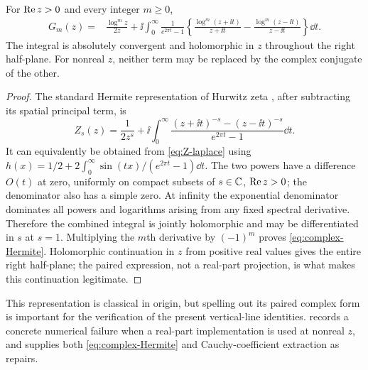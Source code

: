 \begin{proposition}\label{thm:complex-Hermite}
For $\operatorname{Re} z>0$ and every integer $m\ge0$,
\begin{align}
 G_m(z)={}&\frac{\log^m z}{2z}
  +\ii\int_0^\infty\frac1{e^{2\pi t}-1}
       \left\{\frac{\log^m(z+\ii t)}{z+\ii t}
                  -\frac{\log^m(z-\ii t)}{z-\ii t}\right\}\dd t.
                     \label{eq:complex-Hermite}
\end{align}
The integral is absolutely convergent and holomorphic in $z$ throughout
the right half-plane. For nonreal $z$, neither term may be replaced by
the complex conjugate of the other.
\end{proposition}
\begin{proof}
The standard Hermite representation of Hurwitz zeta
\cite{dlmf-zeta}, after subtracting its spatial principal term, is
\[
 Z_s(z)=\frac1{2z^s}
   +\ii\int_0^\infty
        \frac{(z+\ii t)^{-s}-(z-\ii t)^{-s}}{e^{2\pi t}-1}\dd t.
\]
It can equivalently be obtained from \eqref{eq:Z-laplace} using
$h(x)=1/2+2\int_0^\infty\sin(tx)/(e^{2\pi t}-1)\dd t$.
The two powers have a difference $O(t)$ at zero, uniformly on compact
subsets of $s\in\mathbb C$, $\operatorname{Re} z>0$; the denominator also has a simple zero.
At infinity the exponential denominator dominates all powers and
logarithms arising from any fixed spectral derivative. Therefore the
combined integral is jointly holomorphic and may be differentiated in
$s$ at $s=1$. Multiplying the $m$th derivative by $(-1)^m$ proves
\eqref{eq:complex-Hermite}. Holomorphic continuation in $z$ from positive
real values gives the entire right half-plane; the paired expression,
not a real-part projection, is what makes this continuation legitimate.
\end{proof}

This representation is classical in origin, but spelling out its paired
complex form is important for the verification of the present vertical-line
identities.  records a concrete numerical failure
when a real-part implementation is used at nonreal $z$, and supplies both
\eqref{eq:complex-Hermite} and Cauchy-coefficient extraction as repairs.
